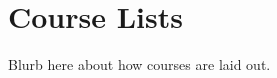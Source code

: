 \section{Course Lists}
\hypertarget{core:lists}{}

Blurb here about how courses are laid out.

\newpage

\newpage

\newpage
